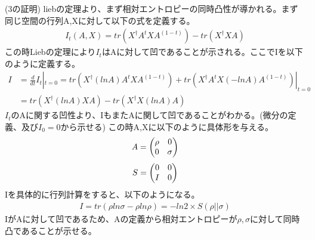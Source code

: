 \documentclass[a4paper,10.5pt]{article}
\numberwithin{equation}{section}
\begin{document}
(3の証明)
liebの定理より、まず相対エントロピーの同時凸性が導かれる。まず同じ空間の行列A,Xに対して以下の式を定義する。
\begin{equation}\begin{split}
    I_{t}(A,X)=tr(X^{\dagger}A^{t}XA^{(1-t)})-tr(X^{\dagger}XA)
\end{split} \end{equation}
この時Liebの定理により$I_{t}$はAに対して凹であることが示される。ここでIを以下のように定義する。
\begin{equation}\begin{split}
    I&=\frac{d}{dt}I_{t}|_{t=0} = tr(X^{\dagger}(lnA)A^{t}XA^{(1-t)})+
    tr(X^{\dagger}A^{t}X(-lnA)A^{(1-t)})|_{t=0}\\
    &=tr(X^{\dagger}(lnA)XA)-tr(X^{\dagger}X(lnA)A)
\end{split} \end{equation}
$I_{t}$のAに関する凹性より、IもまたAに関して凹であることがわかる。(微分の定義、及び$I_{0}=0$から示せる)
この時A,Xに以下のように具体形を与える。
\begin{equation}\begin{split}
    A=\mqty(\rho& 0 \\ 0 &\sigma) 
\end{split} \end{equation}
\begin{equation}\begin{split}
    S=\mqty( 0 & 0 \\ I&0)
\end{split} \end{equation}
Iを具体的に行列計算をすると、以下のようになる。
\begin{equation}\begin{split}
    I=tr(\rho ln \sigma-\rho ln \rho) =-ln2\times S(\rho||\sigma)
\end{split} \end{equation}
IがAに対して凹であるため、Aの定義から相対エントロピーが$\rho,\sigma$に対して同時凸であることが示せる。\\
\end{document}
